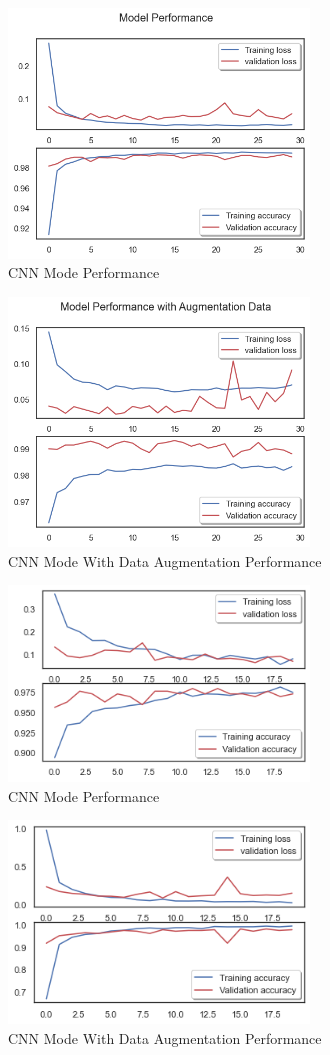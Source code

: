 \documentclass[letterpaper]{article} %
\begin{document}
\begin{figure}[h]
\caption{CNN Mode Performance}
\centering
\includegraphics[width=8cm]{performance.jpg}  
\end{figure}

\begin{figure}[h]
\caption{CNN Mode With Data Augmentation Performance}
\centering
\includegraphics[width=8cm]{performanceAug.jpg}  
\end{figure}

\begin{figure}[h]
\caption{CNN Mode Performance}
\centering
\includegraphics[width=8cm]{small_simple.jpg}  
\end{figure}

\begin{figure}[h]
\caption{CNN Mode With Data Augmentation Performance}
\centering
\includegraphics[width=8cm]{small_aug.jpg}  
\end{figure}
\end{document}
